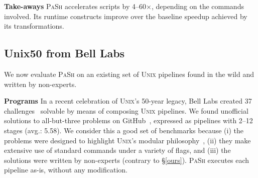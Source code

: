 \documentclass[sigplan, review, screen, anonymous]{acmart}
\newcommand{\heading}[1]{\vspace{4pt}\noindent\textbf{#1}\enspace}
\newcommand{\kk}[1]{[{\color{magenta}kk: #1}]}
\newcommand{\sys}{{\scshape PaSh}\xspace}
\newcommand{\unix}{{\scshape Unix}\xspace}
\begin{document}



\heading{Take-aways}
\sys accelerates scripts by 4--60$\times$, depending on the commands involved.
Its runtime constructs improve over the baseline speedup achieved by its transformations.

\subsection{Unix50 from Bell Labs}
\label{unix50}

We now evaluate \sys on an existing set of \unix pipelines found in the wild and written by non-experts.

\heading{Programs}
In a recent celebration of \unix's 50-year legacy, Bell Labs created 37 challenges~\cite{unix50} solvable by means of composing \unix pipelines.
We found unofficial solutions to all-but-three problems on GitHub~\cite{unix50sol}, expressed as pipelines with 2--12 stages (avg.: 5.58).
We consider this a good set of benchmarks because
  (i) the problems were designed to highlight \unix's modular philosophy~\cite{mcilroy1978unix}, 
  (ii) they make extensive use of standard commands under a variety of flags, and
  (iii) the solutions were written by non-experts (contrary to \S\ref{ours}).
\sys executes each pipeline as-is, without any modification.

\end{document}

